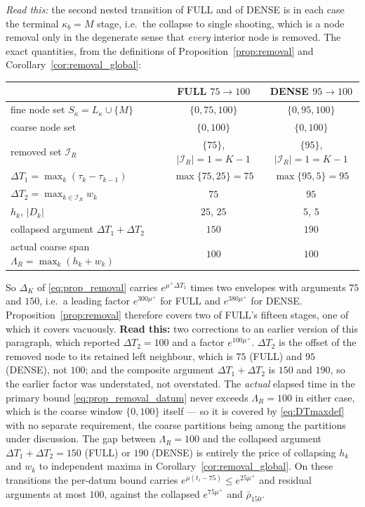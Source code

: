 \documentclass[11pt]{article}
\theoremstyle{remark}\newtheorem{remark}{Remark}
\newcommand{\readthis}[1]{\textbf{Read this:} #1}
\begin{document}
\emph{Read this:} the second nested transition of FULL and of DENSE is in each case the terminal $\kappa_b=M$ stage, i.e.\ the collapse to single shooting, which is a node removal only in the degenerate sense that \emph{every} interior node is removed. The exact quantities, from the definitions of Proposition~\ref{prop:removal} and Corollary~\ref{cor:removal_global}:
\begin{center}\small
\begin{tabular}{lcc}
\toprule
 & FULL $75\to100$ & DENSE $95\to100$\\
\midrule
fine node set $S_{\kappa}=L_\kappa\cup\{M\}$ & $\{0,75,100\}$ & $\{0,95,100\}$\\
coarse node set & $\{0,100\}$ & $\{0,100\}$\\
removed set $\mathcal I_R$ & $\{75\}$, $|\mathcal I_R|=1=K-1$ & $\{95\}$, $|\mathcal I_R|=1=K-1$\\
$\Delta T_1=\max_k(\tau_k-\tau_{k-1})$ & $\max\{75,25\}=75$ & $\max\{95,5\}=95$\\
$\Delta T_2=\max_{k\in\mathcal I_R}w_k$ & $75$ & $95$\\
$h_k$, $|D_k|$ & $25$, $25$ & $5$, $5$\\
collapsed argument $\Delta T_1+\Delta T_2$ & $150$ & $190$\\
actual coarse span $\Lambda_R=\max_{k}(h_k+w_k)$ & $100$ & $100$\\
\bottomrule
\end{tabular}
\end{center}
So $\Delta_K$ of \eqref{eq:prop_removal} carries $e^{\mu^{+}\Delta T_1}$ times two envelopes with arguments $75$ and $150$, i.e.\ a leading factor $e^{300\mu^{+}}$ for FULL and $e^{380\mu^{+}}$ for DENSE. Proposition~\ref{prop:removal} therefore covers two of FULL's fifteen stages, one of which it covers vacuously. \readthis{two corrections to an earlier version of this paragraph, which reported $\Delta T_2=100$ and a factor $e^{100\mu^{+}}$. $\Delta T_2$ is the offset of the removed node to its retained left neighbour, which is $75$ (FULL) and $95$ (DENSE), not $100$; and the composite argument $\Delta T_1+\Delta T_2$ is $150$ and $190$, so the earlier factor was understated, not overstated. The \emph{actual} elapsed time in the primary bound \eqref{eq:prop_removal_datum} never exceeds $\Lambda_R=100$ in either case, which is the coarse window $\{0,100\}$ itself --- so it is covered by \eqref{eq:DTmaxdef} with no separate requirement, the coarse partitions being among the partitions under discussion. The gap between $\Lambda_R=100$ and the collapsed argument $\Delta T_1+\Delta T_2=150$ (FULL) or $190$ (DENSE) is entirely the price of collapsing $h_k$ and $w_k$ to independent maxima in Corollary~\ref{cor:removal_global}. On these transitions the per-datum bound carries $e^{\mu(t_i-75)}\le e^{25\mu^{+}}$ and residual arguments at most $100$, against the collapsed $e^{75\mu^{+}}$ and $\bar\rho_{150}$.}
\end{document}

